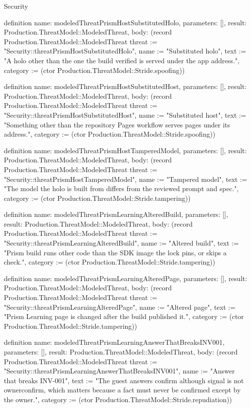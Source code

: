 \begin{lexlean}{Security}
\begin{semanticmodule}
definition{
  name: modeledThreatPrismHostSubstitutedHolo,
  parameters: [],
  result: Production.ThreatModel::ModeledThreat,
  body: (record Production.ThreatModel::ModeledThreat {threat := "Security::threatPrismHostSubstitutedHolo", name := "Substituted holo", text := "A holo other than the one the build verified is served under the app address.", category := (ctor Production.ThreatModel::Stride.spoofing)})
}

definition{
  name: modeledThreatPrismHostSubstitutedHost,
  parameters: [],
  result: Production.ThreatModel::ModeledThreat,
  body: (record Production.ThreatModel::ModeledThreat {threat := "Security::threatPrismHostSubstitutedHost", name := "Substituted host", text := "Something other than the repository Pages workflow serves pages under its address.", category := (ctor Production.ThreatModel::Stride.spoofing)})
}

definition{
  name: modeledThreatPrismHostTamperedModel,
  parameters: [],
  result: Production.ThreatModel::ModeledThreat,
  body: (record Production.ThreatModel::ModeledThreat {threat := "Security::threatPrismHostTamperedModel", name := "Tampered model", text := "The model the holo is built from differs from the reviewed prompt and spec.", category := (ctor Production.ThreatModel::Stride.tampering)})
}

definition{
  name: modeledThreatPrismLearningAlteredBuild,
  parameters: [],
  result: Production.ThreatModel::ModeledThreat,
  body: (record Production.ThreatModel::ModeledThreat {threat := "Security::threatPrismLearningAlteredBuild", name := "Altered build", text := "Prism build runs other code than the SDK image the lock pins, or skips a check.", category := (ctor Production.ThreatModel::Stride.tampering)})
}

definition{
  name: modeledThreatPrismLearningAlteredPage,
  parameters: [],
  result: Production.ThreatModel::ModeledThreat,
  body: (record Production.ThreatModel::ModeledThreat {threat := "Security::threatPrismLearningAlteredPage", name := "Altered page", text := "Prism Learning page is changed after the build published it.", category := (ctor Production.ThreatModel::Stride.tampering)})
}

definition{
  name: modeledThreatPrismLearningAnswerThatBreaksINV001,
  parameters: [],
  result: Production.ThreatModel::ModeledThreat,
  body: (record Production.ThreatModel::ModeledThreat {threat := "Security::threatPrismLearningAnswerThatBreaksINV001", name := "Answer that breaks INV-001", text := "The guest answers confirm although signal is not ownerconfirm, which matters because a fact must never be confirmed except by the owner.", category := (ctor Production.ThreatModel::Stride.repudiation)})
}


\end{semanticmodule}
\end{lexlean}
